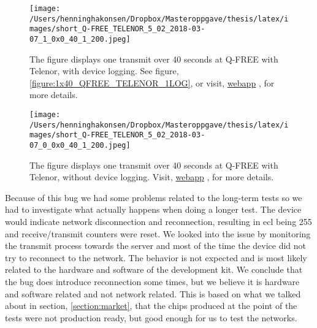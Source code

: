 \documentclass[USenglish]{ifimaster}  %
\begin{document}
\begin{figure}[H]
  \centering
  \texttt{[image: /Users/henninghakonsen/Dropbox/Masteroppgave/thesis/latex/images/short\_Q-FREE\_TELENOR\_5\_02\_2018-03-07\_1\_0x0\_40\_1\_200.jpeg]}
  \caption[Short-term test - loss of connection, with device logging]{The figure displays one transmit over 40 seconds at Q-FREE with Telenor, with device logging. See figure, \vref{figure:1x40_QFREE_TELENOR_1LOG}, or visit, \href{http://158.39.77.97:9000/\#/results/Q-FREE\_TELENOR\_5.02\_2018-03-07\_1\_0x0\_40\_1\_200}{webapp} \cite{online:result4}, for more details.}
  \label{figure:1x40_QFREE_TELENOR_1LOG_SHORT}
\end{figure}

\begin{figure}[H]
  \centering
  \texttt{[image: /Users/henninghakonsen/Dropbox/Masteroppgave/thesis/latex/images/short\_Q-FREE\_TELENOR\_5\_02\_2018-03-07\_0\_0x0\_40\_1\_200.jpeg]}
  \caption[Short-term test - loss of connection, without device logging]{The figure displays one transmit over 40 seconds at Q-FREE with Telenor, without device logging. Visit, \href{http://158.39.77.97:9000/\#/results/Q-FREE_TELENOR\_5.02\_2018-03-07\_0\_0x0\_40\_1\_200}{webapp} \cite{online:result3}, for more details.}
  \label{figure:1x40_QFREE_TELENOR_0LOG_SHORT}
\end{figure}

Because of this bug we had some problems related to the long-term tests so we had to investigate what actually happens when doing a longer test. The device would indicate network disconnection and reconnection, resulting in \acrshort{ecl} being 255 and receive/transmit counters were reset. We looked into the issue by monitoring the transmit process towards the server and most of the time the device did not try to reconnect to the network. The behavior is not expected and is most likely related to the hardware and software of the development kit. We conclude that the bug does introduce reconnection some times, but we believe it is hardware and software related and not network related. This is based on what we talked about in section, \vref{section:market}, that the chips produced at the point of the tests were not production ready, but good enough for us to test the networks.
\end{document}
